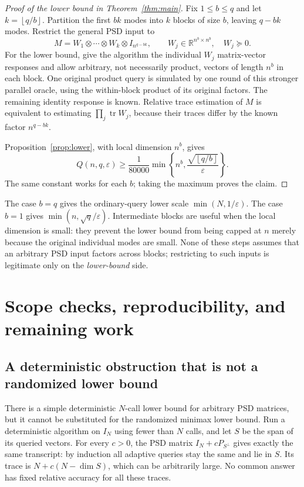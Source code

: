 \documentclass[11pt]{article}
\theoremstyle{definition}\newtheorem{definition}[theorem]{Definition}
\theoremstyle{remark}\newtheorem{remark}[theorem]{Remark}
\newcommand{\R}{\mathbb R}\newcommand{\C}{\mathbb C}
\newcommand{\tr}{\operatorname{tr}}\newcommand{\rank}{\operatorname{rank}}
\newcommand{\eps}{\varepsilon}\newcommand{\Qprod}{Q_{\mathrm{prod}}}
\newcommand{\floor}[1]{\left\lfloor#1\right\rfloor}
\begin{document}
\begin{proof}[Proof of the lower bound in Theorem~\ref{thm:main}]
Fix $1\le b\le q$ and let $k=\floor{q/b}$. Partition the first $bk$ modes into
$k$ blocks of size $b$, leaving $q-bk$ modes. Restrict the general PSD input to
\[
 M=W_1\otimes\cdots\otimes W_k\otimes I_{n^{q-bk}},
       \qquad W_j\in\R^{n^b\times n^b},\quad W_j\succeq0.
\]
For the lower bound, give the algorithm the individual $W_j$ matrix-vector
responses and allow arbitrary, not necessarily product, vectors of length $n^b$
in each block. One original product query is simulated by one round of this
stronger parallel oracle, using the within-block product of its original
factors. The remaining identity response is known. Relative trace estimation of
$M$ is equivalent to estimating $\prod_j\tr W_j$, because their traces differ
by the known factor $n^{q-bk}$.

Proposition~\ref{prop:lower}, with local dimension $n^b$, gives
\[
 Q(n,q,\eps)\ge\frac1{80000}
      \min\left\{n^b,\frac{\sqrt{\floor{q/b}}}{\eps}\right\}.
\]
The same constant works for each $b$; taking the maximum proves the claim.
\end{proof}

The case $b=q$ gives the ordinary-query lower scale $\min(N,1/\eps)$.
The case $b=1$ gives $\min(n,\sqrt q/\eps)$.
Intermediate blocks are useful when the local dimension is small: they prevent
the lower bound from being capped at $n$ merely because the original individual
modes are small. None of these steps assumes that an arbitrary PSD input
factors across blocks; restricting to such inputs is legitimate only on the
\emph{lower-bound} side.

\section{Scope checks, reproducibility, and remaining work}
\label{sec:scope}

\subsection{A deterministic obstruction that is not a randomized lower bound}
There is a simple deterministic $N$-call lower bound for arbitrary PSD matrices,
but it cannot be substituted for the randomized minimax lower bound.
Run a deterministic algorithm on $I_N$ using fewer than $N$ calls, and let $S$
be the span of its queried vectors. For every $c>0$, the PSD matrix
$I_N+cP_{S^\perp}$ gives exactly the same transcript: by induction all adaptive
queries stay the same and lie in $S$. Its trace is $N+c(N-\dim S)$, which can
be arbitrarily large. No common answer has fixed relative accuracy for all
these traces.
\end{document}

